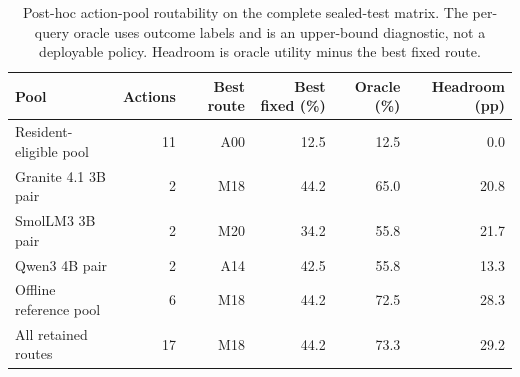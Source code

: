 \begin{table}[t]
\caption{Post-hoc action-pool routability on the complete sealed-test matrix. The per-query oracle uses outcome labels and is an upper-bound diagnostic, not a deployable policy. Headroom is oracle utility minus the best fixed route.}
\label{tab:routability-pools}
\centering
\small
\begin{tabular}{@{}lrrrrr@{}}
\toprule
Pool & Actions & Best route & Best fixed (\%) & Oracle (\%) & Headroom (pp) \\
\midrule
Resident-eligible pool & 11 & A00 & 12.5 & 12.5 & 0.0 \\
Granite 4.1 3B pair & 2 & M18 & 44.2 & 65.0 & 20.8 \\
SmolLM3 3B pair & 2 & M20 & 34.2 & 55.8 & 21.7 \\
Qwen3 4B pair & 2 & A14 & 42.5 & 55.8 & 13.3 \\
Offline reference pool & 6 & M18 & 44.2 & 72.5 & 28.3 \\
All retained routes & 17 & M18 & 44.2 & 73.3 & 29.2 \\
\bottomrule
\end{tabular}
\end{table}
